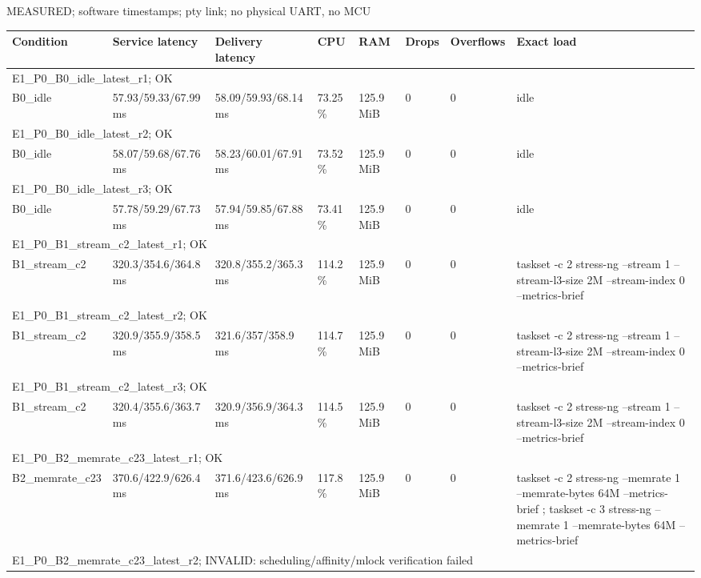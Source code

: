 \par\noindent MEASURED; software timestamps; pty link; no physical UART, no MCU\par
\begin{tabular}{llllllll}
\toprule
Condition & Service latency & Delivery latency & CPU & RAM & Drops & Overflows & Exact load \\
\midrule
\multicolumn{8}{l}{E1\_P0\_B0\_idle\_latest\_r1; OK} \\
B0\_idle & 57.93/59.33/67.99 ms & 58.09/59.93/68.14 ms & 73.25 \% & 125.9 MiB & 0 & 0 & idle \\
\multicolumn{8}{l}{E1\_P0\_B0\_idle\_latest\_r2; OK} \\
B0\_idle & 58.07/59.68/67.76 ms & 58.23/60.01/67.91 ms & 73.52 \% & 125.9 MiB & 0 & 0 & idle \\
\multicolumn{8}{l}{E1\_P0\_B0\_idle\_latest\_r3; OK} \\
B0\_idle & 57.78/59.29/67.73 ms & 57.94/59.85/67.88 ms & 73.41 \% & 125.9 MiB & 0 & 0 & idle \\
\multicolumn{8}{l}{E1\_P0\_B1\_stream\_c2\_latest\_r1; OK} \\
B1\_stream\_c2 & 320.3/354.6/364.8 ms & 320.8/355.2/365.3 ms & 114.2 \% & 125.9 MiB & 0 & 0 & taskset -c 2 stress-ng --stream 1 --stream-l3-size 2M --stream-index 0 --metrics-brief \\
\multicolumn{8}{l}{E1\_P0\_B1\_stream\_c2\_latest\_r2; OK} \\
B1\_stream\_c2 & 320.9/355.9/358.5 ms & 321.6/357/358.9 ms & 114.7 \% & 125.9 MiB & 0 & 0 & taskset -c 2 stress-ng --stream 1 --stream-l3-size 2M --stream-index 0 --metrics-brief \\
\multicolumn{8}{l}{E1\_P0\_B1\_stream\_c2\_latest\_r3; OK} \\
B1\_stream\_c2 & 320.4/355.6/363.7 ms & 320.9/356.9/364.3 ms & 114.5 \% & 125.9 MiB & 0 & 0 & taskset -c 2 stress-ng --stream 1 --stream-l3-size 2M --stream-index 0 --metrics-brief \\
\multicolumn{8}{l}{E1\_P0\_B2\_memrate\_c23\_latest\_r1; OK} \\
B2\_memrate\_c23 & 370.6/422.9/626.4 ms & 371.6/423.6/626.9 ms & 117.8 \% & 125.9 MiB & 0 & 0 & taskset -c 2 stress-ng --memrate 1 --memrate-bytes 64M --metrics-brief ; taskset -c 3 stress-ng --memrate 1 --memrate-bytes 64M --metrics-brief \\
\multicolumn{8}{l}{E1\_P0\_B2\_memrate\_c23\_latest\_r2; INVALID: scheduling/affinity/mlock verification failed} \\

\end{tabular}
